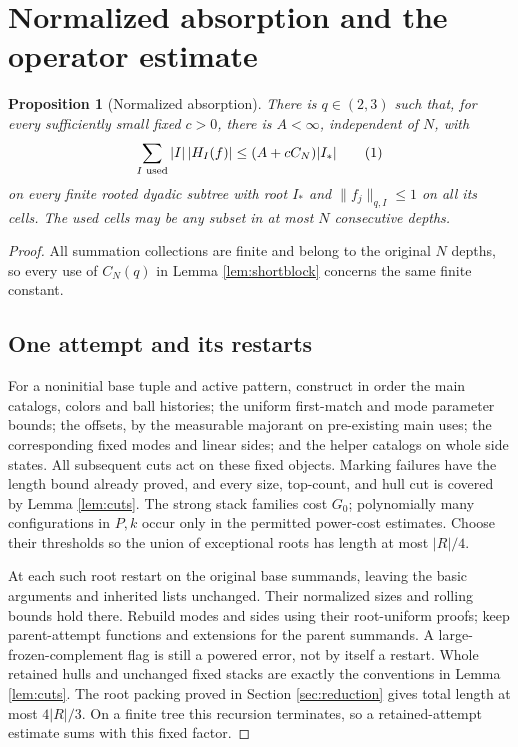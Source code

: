 \documentclass[11pt]{article}
\newtheorem{proposition}[theorem]{Proposition}
\theoremstyle{definition}
\newcommand{\eqtag}[1]{\refstepcounter{equation}\tag{\theequation}\label{#1}}
\numberwithin{equation}{section}
\begin{document}
\section{Normalized absorption and the operator estimate}\label{sec:completion}
\begin{proposition}[Normalized absorption]\label{prop:normalized}
There is $q\in(2,3)$ such that, for every sufficiently small fixed $c>0$, there is $A<\infty$, independent of $N$, with
\[
 \sum_{I\text{ used}}|I|\,|H_I(f)|\le(A+cC_N)|I_*|
 \eqtag{eq:normalized}
\]
on every finite rooted dyadic subtree with root $I_*$ and $\|f_j\|_{q,I}\le1$ on all its cells. The used cells may be any subset in at most $N$ consecutive depths.
\end{proposition}
\begin{proof}
All summation collections are finite and belong to the original $N$ depths, so every use of $C_N(q)$ in Lemma \ref{lem:shortblock} concerns the same finite constant.

\subsection*{One attempt and its restarts}
For a noninitial base tuple and active pattern, construct in order the main catalogs, colors and ball histories; the uniform first-match and mode parameter bounds; the offsets, by the measurable majorant on pre-existing main uses; the corresponding fixed modes and linear sides; and the helper catalogs on whole side states. All subsequent cuts act on these fixed objects. Marking failures have the length bound already proved, and every size, top-count, and hull cut is covered by Lemma \ref{lem:cuts}. The strong stack families cost $G_0$; polynomially many configurations in $P,k$ occur only in the permitted power-cost estimates. Choose their thresholds so the union of exceptional roots has length at most $|R|/4$.

At each such root restart on the original base summands, leaving the basic arguments and inherited lists unchanged. Their normalized sizes and rolling bounds hold there. Rebuild modes and sides using their root-uniform proofs; keep parent-attempt functions and extensions for the parent summands. A large-frozen-complement flag is still a powered error, not by itself a restart. Whole retained hulls and unchanged fixed stacks are exactly the conventions in Lemma \ref{lem:cuts}. The root packing proved in Section \ref{sec:reduction} gives total length at most $4|R|/3$. On a finite tree this recursion terminates, so a retained-attempt estimate sums with this fixed factor.


\end{proof}
\end{document}
